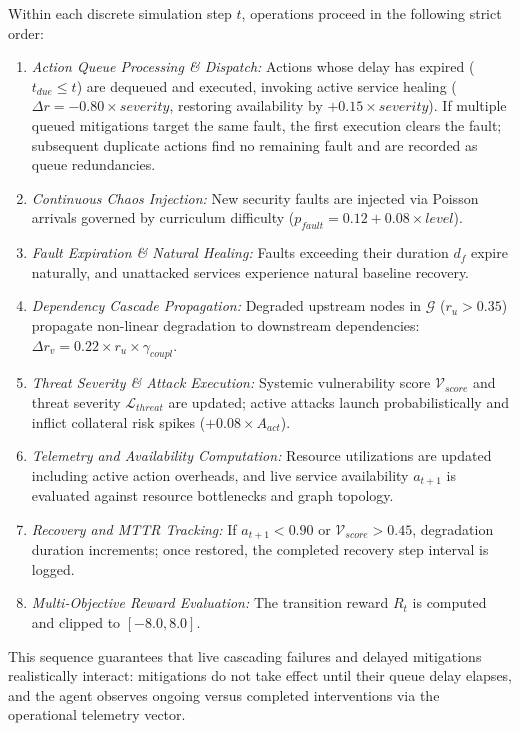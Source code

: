 \documentclass[ASNA,twocolumn]{USG}
\begin{document}
Within each discrete simulation step $t$, operations proceed in the following strict order:
\begin{enumerate}
    \item \textit{Action Queue Processing \& Dispatch:} Actions whose delay has expired ($t_{due} \le t$) are dequeued and executed, invoking active service healing ($\Delta r = -0.80 \times severity$, restoring availability by $+0.15 \times severity$). If multiple queued mitigations target the same fault, the first execution clears the fault; subsequent duplicate actions find no remaining fault and are recorded as queue redundancies.
    \item \textit{Continuous Chaos Injection:} New security faults are injected via Poisson arrivals governed by curriculum difficulty ($p_{fault} = 0.12 + 0.08 \times level$).
    \item \textit{Fault Expiration \& Natural Healing:} Faults exceeding their duration $d_f$ expire naturally, and unattacked services experience natural baseline recovery.
    \item \textit{Dependency Cascade Propagation:} Degraded upstream nodes in $\mathcal{G}$ ($r_u > 0.35$) propagate non-linear degradation to downstream dependencies: $\Delta r_v = 0.22 \times r_u \times \gamma_{coupl}$.
    \item \textit{Threat Severity \& Attack Execution:} Systemic vulnerability score $\mathcal{V}_{score}$ and threat severity $\mathcal{L}_{threat}$ are updated; active attacks launch probabilistically and inflict collateral risk spikes ($+0.08 \times A_{act}$).
    \item \textit{Telemetry and Availability Computation:} Resource utilizations are updated including active action overheads, and live service availability $a_{t+1}$ is evaluated against resource bottlenecks and graph topology.
    \item \textit{Recovery and MTTR Tracking:} If $a_{t+1} < 0.90$ or $\mathcal{V}_{score} > 0.45$, degradation duration increments; once restored, the completed recovery step interval is logged.
    \item \textit{Multi-Objective Reward Evaluation:} The transition reward $R_t$ is computed and clipped to $[-8.0, 8.0]$.
\end{enumerate}
This sequence guarantees that live cascading failures and delayed mitigations realistically interact: mitigations do not take effect until their queue delay elapses, and the agent observes ongoing versus completed interventions via the operational telemetry vector.
\end{document}
